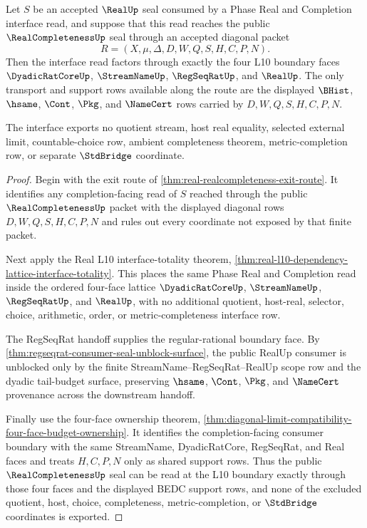 \begin{theorem}
\label{thm:real-completeness-l10-exit-interface-exhaustion}
Let $S$ be an accepted $\RealUp$ seal consumed by a Phase Real and Completion
interface read, and suppose that this read reaches the public
$\RealCompletenessUp$ seal through an accepted diagonal packet
$$
R=(X,\mu,\Delta,D,W,Q,S,H,C,P,N).
$$
Then the interface read factors through exactly the four L10 boundary faces
$\DyadicRatCoreUp$, $\StreamNameUp$, $\RegSeqRatUp$, and $\RealUp$. The only
transport and support rows available along the route are the displayed
$\BHist$, $\hsame$, $\Cont$, $\Pkg$, and $\NameCert$ rows carried by
$D,W,Q,S,H,C,P,N$.

The interface exports no quotient stream, host real equality, selected
external limit, countable-choice row, ambient completeness theorem,
metric-completion row, or separate $\StdBridge$ coordinate.
\end{theorem}
\begin{proof}
Begin with the exit route of
\autoref{thm:real-realcompleteness-exit-route}. It identifies any
completion-facing read of $S$ reached through the public
$\RealCompletenessUp$ packet with the displayed diagonal rows
$D,W,Q,S,H,C,P,N$ and rules out every coordinate not exposed by that finite
packet.

Next apply the Real L10 interface-totality theorem,
\autoref{thm:real-l10-dependency-lattice-interface-totality}. This places the
same Phase Real and Completion read inside the ordered four-face lattice
$\DyadicRatCoreUp$, $\StreamNameUp$, $\RegSeqRatUp$, and $\RealUp$, with no
additional quotient, host-real, selector, choice, arithmetic, order, or
metric-completeness interface row.

The RegSeqRat handoff supplies the regular-rational boundary face. By
\autoref{thm:regseqrat-consumer-seal-unblock-surface}, the public RealUp
consumer is unblocked only by the finite StreamName--RegSeqRat--RealUp scope
row and the dyadic tail-budget surface, preserving $\hsame$, $\Cont$, $\Pkg$,
and $\NameCert$ provenance across the downstream handoff.

Finally use the four-face ownership theorem,
\autoref{thm:diagonal-limit-compatibility-four-face-budget-ownership}. It
identifies the completion-facing consumer boundary with the same
StreamName, DyadicRatCore, RegSeqRat, and Real faces and treats
$H,C,P,N$ only as shared support rows. Thus the public
$\RealCompletenessUp$ seal can be read at the L10 boundary exactly through
those four faces and the displayed BEDC support rows, and none of the excluded
quotient, host, choice, completeness, metric-completion, or $\StdBridge$
coordinates is exported.
\end{proof}

